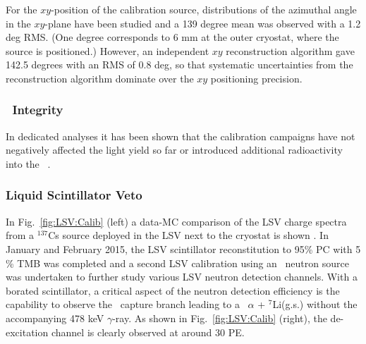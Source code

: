 For the $xy$-position of the calibration source, distributions of the azimuthal angle in the $xy$-plane have been studied and a 139 degree mean was observed with a 1.2 deg RMS. (One degree corresponds to 6 mm at the outer cryostat, where the source is positioned.) However, an independent $xy$ reconstruction algorithm gave 142.5 degrees with an RMS of 0.8 deg, so that systematic uncertainties from the reconstruction algorithm dominate over the $xy$ positioning precision. %

\subsubsection{\lsv\ Integrity}
In dedicated analyses it has been shown that the calibration campaigns have not negatively affected the light yield so far or introduced additional radioactivity into the \lsv\ \cite{Agnes:2015qyz}.

\subsubsection{Liquid Scintillator Veto}\label{sec:LSV:gammasources}
In Fig.~\ref{fig:LSV:Calib} (left) a data-MC comparison of the LSV charge spectra from a $^{137}$Cs source deployed in the LSV next to the cryostat is shown \cite{DS50:G4DS:paper}.
In January and February 2015, the LSV scintillator reconstitution to 95\% PC with 5 \% TMB was completed and a second LSV calibration using an \AmBe\ neutron source was undertaken to further study various LSV neutron detection channels. With a borated scintillator, a critical aspect of the neutron detection efficiency is the capability to observe the \brbortenground\ capture branch leading to a \enbortengroundalpha\ $\alpha$ + $^7$Li(g.s.) without the accompanying 478 keV $\gamma$-ray. As shown in Fig.~\ref{fig:LSV:Calib} (right), the de-excitation channel is clearly observed at around 30 PE.

